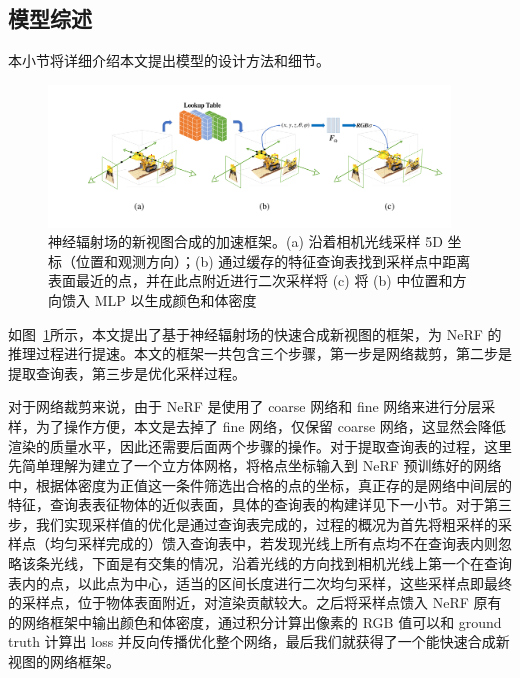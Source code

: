\subsection{模型综述}
本小节将详细介绍本文提出模型的设计方法和细节。
\begin{figure}[t]
    \centering
    \includegraphics[width=0.95\textwidth, height=0.25\textheight]{figures/fnerf.pdf}
    \caption{神经辐射场的新视图合成的加速框架。(a) 沿着相机光线采样 5D 坐标（位置和观测方向）；(b) 通过缓存的特征查询表找到采样点中距离表面最近的点，并在此点附近进行二次采样将 (c) 将 (b) 中位置和方向馈入 MLP 以生成颜色和体密度}
    \label{fig:fnerf}
\end{figure}
如图~\ref{fig:fnerf}所示，本文提出了基于神经辐射场的快速合成新视图的框架，为 NeRF 的推理过程进行提速。本文的框架一共包含三个步骤，第一步是网络裁剪，第二步是提取查询表，第三步是优化采样过程。

对于网络裁剪来说，由于 NeRF 是使用了 coarse 网络和 fine 网络来进行分层采样，为了操作方便，本文是去掉了 fine 网络，仅保留 coarse 网络，这显然会降低渲染的质量水平，因此还需要后面两个步骤的操作。对于提取查询表的过程，这里先简单理解为建立了一个立方体网格，将格点坐标输入到 NeRF 预训练好的网络中，根据体密度为正值这一条件筛选出合格的点的坐标，真正存的是网络中间层的特征，查询表表征物体的近似表面，具体的查询表的构建详见下一小节。对于第三步，我们实现采样值的优化是通过查询表完成的，过程的概况为首先将粗采样的采样点（均匀采样完成的）馈入查询表中，若发现光线上所有点均不在查询表内则忽略该条光线，下面是有交集的情况，沿着光线的方向找到相机光线上第一个在查询表内的点，以此点为中心，适当的区间长度进行二次均匀采样，这些采样点即最终的采样点，位于物体表面附近，对渲染贡献较大。之后将采样点馈入 NeRF 原有的网络框架中输出颜色和体密度，通过积分计算出像素的 RGB 值可以和 ground truth 计算出 loss 并反向传播优化整个网络，最后我们就获得了一个能快速合成新视图的网络框架。

